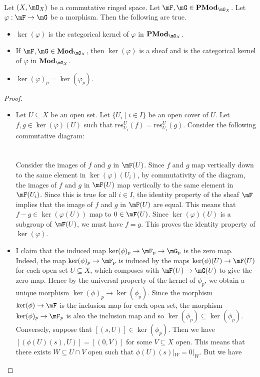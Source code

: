 \documentclass[a4paper]{article}
\begin{document}
\begin{prp}{}{}\\
Let $(X,\mO_X)$ be a commutative ringed space. Let $\mF,\mG\in\bold{PMod}_{\mO_X}$. Let $\varphi:\mF\to\mG$ be a morphism. Then the following are true. 
\begin{itemize}
\item $\ker(\varphi)$ is the categorical kernel of $\varphi$ in $\bold{PMod}_{\mO_X}$. 
\item If $\mF,\mG\in\bold{Mod}_{\mO_X}$, then $\ker(\varphi)$ is a sheaf and is the categorical kernel of $\varphi$ in $\bold{Mod}_{\mO_X}$. 
\item $\ker(\varphi)_p=\ker(\varphi_p)$. 
\end{itemize}
\begin{proof}\\
\begin{itemize}
\item Let $U\subseteq X$ be an open set. Let $\{U_i\;|\;i\in I\}$ be an open cover of $U$. Let $f,g\in\ker(\varphi)(U)$ such that $\text{res}_{U_i}^U(f)=\text{res}_{U_i}^U(g)$. Consider the following commutative diagram: \\
 \\~\\
Consider the images of $f$ and $g$ in $\mF(U)$. Since $f$ and $g$ map vertically down to the same element in $\ker(\varphi)(U_i)$, by commutativity of the diagram, the images of $f$ and $g$ in $\mF(U)$ map vertically to the same element in $\mF(U_i)$. Since this is true for all $i\in I$, the identity property of the sheaf $\mF$ implies that the image of $f$ and $g$ in $\mF(U)$ are equal. This means that $f-g\in\ker(\varphi(U))$ map to $0\in\mF(U)$. Since $\ker(\varphi)(U)$ is a subgroup of $\mF(U)$, we must have $f=g$. This proves the identity property of $\ker(\varphi)$. 
\item I claim that the induced map $\ker(\phi)_p\to\mF_p\to\mG_p$ is the zero map. Indeed, the map $\ker(\phi)_p\to\mF_p$ is induced by the maps $\ker(\phi)(U)\to\mF(U)$ for each open set $U\subseteq X$, which composes with $\mF(U)\to\mG(U)$ to give the zero map. Hence by the universal property of the kernel of $\phi_p$, we obtain a unique morphism $\ker(\phi)_p\to\ker(\phi_p)$. Since the morphism $\ker(\phi)\to\mF$ is the inclusion map for each open set, the morphism $\ker(\phi)_p\to\mF_p$ is also the inclusion map and so $\ker(\phi_p)\subseteq\ker(\phi_p)$. Conversely, suppose that $[(s,U)]\in\ker(\phi_p)$. Then we have $[(\phi(U)(s),U)]=[(0,V)]$ for some $V\subseteq X$ open. This means that there exists $W\subseteq U\cap V$ open such that $\phi(U)(s)|_W=0|_W$. But we have 

\end{itemize}
\end{proof}
\end{prp}
\end{document}
